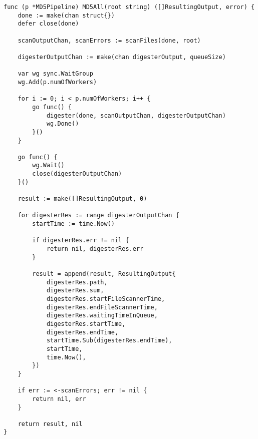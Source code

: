 \begin{lstlisting}[label=lst:aggregate,caption={Запуск конвейера}]
func (p *MD5Pipeline) MD5All(root string) ([]ResultingOutput, error) {
    done := make(chan struct{})
    defer close(done)

    scanOutputChan, scanErrors := scanFiles(done, root)

    digesterOutputChan := make(chan digesterOutput, queueSize)

    var wg sync.WaitGroup
    wg.Add(p.numOfWorkers)

    for i := 0; i < p.numOfWorkers; i++ {
        go func() {
            digester(done, scanOutputChan, digesterOutputChan)
            wg.Done()
        }()
    }

    go func() {
        wg.Wait()
        close(digesterOutputChan)
    }()

    result := make([]ResultingOutput, 0)

    for digesterRes := range digesterOutputChan {
        startTime := time.Now()

        if digesterRes.err != nil {
            return nil, digesterRes.err
        }

        result = append(result, ResultingOutput{
            digesterRes.path,
            digesterRes.sum,
            digesterRes.startFileScannerTime,
            digesterRes.endFileScannerTime,
            digesterRes.waitingTimeInQueue,
            digesterRes.startTime,
            digesterRes.endTime,
            startTime.Sub(digesterRes.endTime),
            startTime,
            time.Now(),
        })
    }

    if err := <-scanErrors; err != nil {
        return nil, err
    }

    return result, nil
}
\end{lstlisting}


